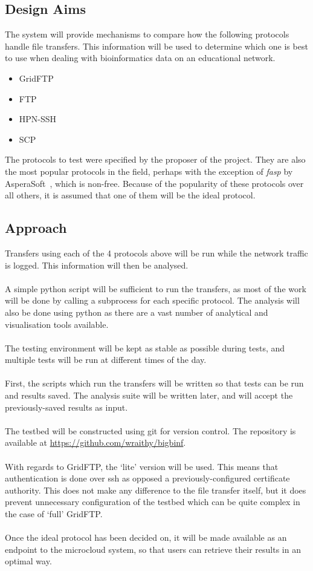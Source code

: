 \documentclass{sig-alternate-05-2015}
\begin{document}
\subsection{Design Aims} %
The system will provide mechanisms to compare how the following protocols handle file transfers. This information will be used to determine which one is best to use when dealing with bioinformatics data on an educational network.
\begin{itemize}
	\item GridFTP
	\item FTP
	\item HPN-SSH
	\item SCP
\end{itemize}
The protocols to test were specified by the proposer of the project. They are also the most popular protocols in the field, perhaps with the exception of \textit{fasp} by AsperaSoft~\cite{beloslyudtsev2014aspera}, which is non-free. Because of the popularity of these protocols over all others, it is assumed that one of them will be the ideal protocol.\\

\subsection{Approach}
Transfers using each of the 4 protocols above will be run while the network traffic is logged. This information will then be analysed.\\\\
A simple python script will be sufficient to run the transfers, as most of the work will be done by calling a subprocess for each specific protocol. The analysis will also be done using python as there are a vast number of analytical and visualisation tools available.\\\\
The testing environment will be kept as stable as possible during tests, and multiple tests will be run at different times of the day.\\\\
First, the scripts which run the transfers will be written so that tests can be run and results saved. The analysis suite will be written later, and will accept the previously-saved results as input.\\\\
The testbed will be constructed using git for version control. The repository is available at \url{https://github.com/wraithy/bigbinf}.\\\\
With regards to GridFTP, the `lite' version will be used. This means that authentication is done over ssh as opposed a previously-configured certificate authority. This does not make any difference to the file transfer itself, but it does prevent unnecessary configuration of the testbed which can be quite complex in the case of `full' GridFTP.\\\\
Once the ideal protocol has been decided on, it will be made available as an endpoint to the microcloud system, so that users can retrieve their results in an optimal way.
\end{document}
